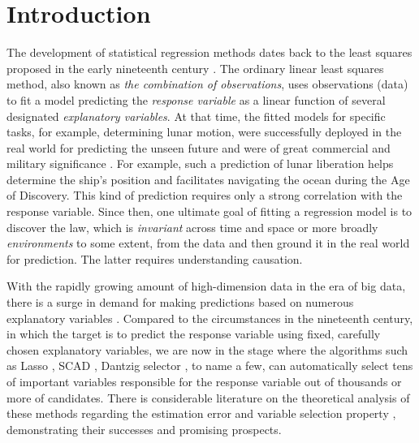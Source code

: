 \documentclass[10pt]{article}
\numberwithin{equation}{section}
\begin{document}
{

\section{Introduction}

The development of statistical regression methods dates back to the least squares proposed in the early nineteenth century \citep{legendre1805leastsquares, gauss1809leastsquares}. The ordinary linear least squares method, also known as {\it the combination of observations}, uses observations (data) to fit a model predicting the {\it response variable} as a linear function of several designated {\it explanatory variables}. At that time, the fitted models for specific tasks, for example, determining lunar motion, were successfully deployed in the real world for predicting the unseen future and were of great commercial and military significance \citep{stigler1986history}. For example, such a prediction of lunar liberation helps determine the ship's position and facilitates navigating the ocean during the Age of Discovery. This kind of prediction requires only a strong correlation with the response variable. Since then, one ultimate goal of fitting a regression model is to discover the law, which is {\it invariant} across time and space or more broadly {\it environments} to some extent, from the data and then ground it in the real world for prediction. The latter requires understanding causation.  

With the rapidly growing amount of high-dimension data in the era of big data, there is a surge in demand for making predictions based on numerous explanatory variables \citep{fan2014challenges,  wainwright2019high, fan2020statistical}. Compared to the circumstances in the nineteenth century, in which the target is to predict the response variable using fixed, carefully chosen explanatory variables, we are now in the stage where the algorithms such as Lasso \citep{tibshirani1997lasso}, SCAD \citep{fan2001variable}, Dantzig selector \citep{candes2007dantzig}, to name a few, can automatically select tens of important variables responsible for the response variable out of thousands or more of candidates. There is considerable literature on the theoretical analysis of these methods regarding the estimation error and variable selection property \citep{zhao2006model, candes2007dantzig, bickel2009simultaneous, buhlmann2011statistics, wainwright2019high, fan2020statistical}, demonstrating their successes and promising prospects.

}
\end{document}

